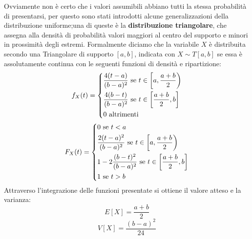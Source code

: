 \documentclass[a4paper,12pt, oneside]{book}
\begin{document}
Ovviamente non è certo che i valori assumibili abbiano tutti la stessa probabilità di presentarsi, per questo
sono stati introdotti alcune generalizzazioni della distribuzione uniforme;una di queste è la
\textbf{distribuzione triangolare}, che assegna alla densità di probabilità valori maggiori al centro del
supporto e minori in prossimità degli estremi.\newline
Formalmente diciamo che la variabile $X$ è distribuita secondo una Triangolare di supporto $[a,b]$, indicata
con $X \sim T[a, b]$ se essa è assolutamente continua con le seguenti funzioni di densità e ripartizione:
\[f_X(t) = \begin{dcases}
            \frac{4(t-a)}{(b-a)^2} \mbox{ se } t \in \left[a,\frac{a+b}{2}\right)\\
            \frac{4(b-t)}{(b-a)^2} \mbox{ se } t \in \left[\frac{a+b}{2},b\right]\\
            0                      \mbox{ altrimenti}
            \end{dcases}\]
\[F_X(t) = \begin{dcases}
            0 \mbox{ se } t<a\\
            \frac{2(t-a)^2}{(b-a)^2} \mbox{ se } t \in \left[a, \frac{a+b}{2}\right)\\
            1-2\frac{(b-t)^2}{(b-a)^2} \mbox{ se } t \in \left[\frac{a+b}{2}, b\right]\\
            1 \mbox{ se } t>b\\
            \end{dcases}\]
Attraverso l'integrazione delle funzioni presentate si ottiene il valore atteso e la varianza:
\[E[X] = \frac{a+b}{2}\]
\[V[X] = \frac{(b-a)^2}{24}\]
\end{document}
